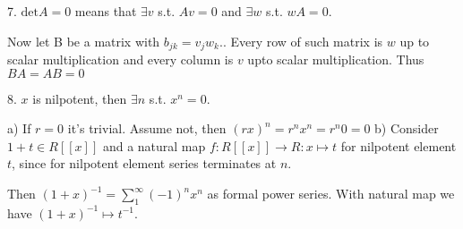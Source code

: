 \documentclass{amsart}
\begin{document}
7. $\text{det} A = 0$ means that $\exists v$ s.t. $Av = 0$ and $\exists w$ s.t. $wA = 0$.

Now let B be a matrix with $b_{jk} = v_j w_k$.. Every row of such matrix is $w$ up to scalar multiplication and every column is $v$ upto scalar multiplication.
Thus $BA = AB = 0$

8. $x$ is nilpotent, then $\exists n$ s.t. $x^n = 0$.

a) If $r=0$ it's trivial. Assume not, then $(rx)^n = r^n x^n = r^n 0 = 0$
b) Consider $1+t \in R[[x]]$ and a natural map $f: R[[x]] \to R: x \mapsto t$ for nilpotent element $t$, since for nilpotent element series terminates at $n$.


Then $(1+x)^{-1} = \sum_1 ^ \infty (-1)^n x^n$ as formal power series. With natural map we have $(1+x)^{-1} \mapsto t^{-1}$.
\end{document}
